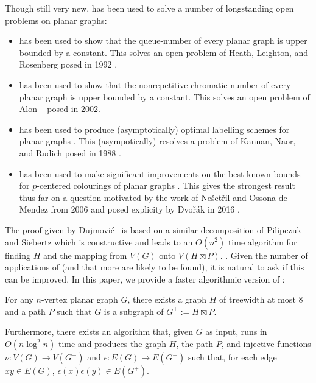 \documentclass[kpfonts]{patmorin}
\begin{document}
Though still very new,  has been used to solve a number of longstanding open problems on planar graphs:
\begin{itemize}
  \item {} has been used to show that the queue-number of every planar graph is upper bounded by a constant.  This solves an open problem of Heath, Leighton, and Rosenberg posed in 1992 \cite{heath.leighton.ea:comparing}.
  \item {} has been used to show that the nonrepetitive chromatic number of every planar graph is upper bounded by a constant. This solves an open problem of Alon \etal\  \cite{alon.grytczuk.ea:nonrepetitive} posed in 2002.
  \item {} has been used to produce (asymptotically) optimal labelling schemes for planar graphs \cite{dujmovic.esperet.ea:adjacency}.  This (asympotically) resolves a problem of Kannan, Naor, and Rudich posed in 1988 \cite{kannan.naor.ea:implicit-stoc,kannan.naor.ea:implicit}.
  \item {} has been used to make significant improvements on the best-known bounds for $p$-centered colourings of planar graphs \cite{debski.felsner.ea:improved}.  This gives the strongest result thus far on a question motivated by the work of Nešetřil and Ossona de Mendez from 2006 \cite{nesetril.ossona:tree,nesetril.ossona:grad} and posed explicity by Dvořák in 2016 \cite{dvorak:question}.
\end{itemize}

The proof given by Dujmović \etal\  is based on a similar decomposition of Pilipczuk and Siebertz \cite{pilipczuk.siebertz:polynomial-soda} which is constructive and leads to an $O(n^2)$ time algorithm for finding $H$ and the mapping from $V(G)$ onto $V(H\boxtimes P)$.
\cite[Section~10]{dujmovic.joret.ea:planar}. Given the number of applications of  (and that more are likely to be found), it is natural to ask if this can be improved.  In this paper, we provide a faster algorithmic version of :

\begin{thm}
  For any $n$-vertex planar graph $G$, there exists a graph $H$ of treewidth at most 8 and a path $P$ such that $G$ is a subgraph of $G^+:=H\boxtimes P$.

  Furthermore, there exists an algorithm that, given $G$ as input, runs in $O(n\log^2 n)$ time and produces the graph $H$, the path $P$, and injective functions $\nu:V(G)\to V(G^+)$ and $\epsilon:E(G)\to E(G^+)$ such that, for each edge $xy\in E(G)$,  $\epsilon(x)\epsilon(y)\in E(G^+)$.
\end{thm}
\end{document}
